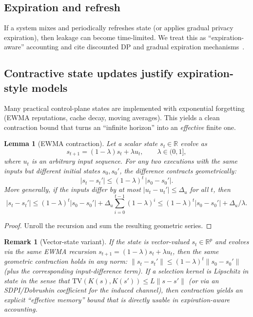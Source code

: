 \documentclass[11pt]{article}
\newtheorem{lemma}{Lemma}
\newtheorem{remark}{Remark}
\newcommand{\TV}{\mathrm{TV}}
\begin{document}
\subsection{Expiration and refresh}
\label{sec:expiration}
If a system mixes and periodically refreshes state (or applies gradual privacy expiration), then leakage can become time-limited.
We treat this as ``expiration-aware'' accounting and cite discounted DP and gradual expiration mechanisms~\cite{Farokhi2020DiscountedDP,AnderssonEtAl2024GradualExpiration}.

\subsection{Contractive state updates justify expiration-style models}
\label{sec:contraction}
Many practical control-plane states are implemented with exponential forgetting (EWMA reputations, cache decay, moving averages).
This yields a clean contraction bound that turns an ``infinite horizon'' into an \emph{effective} finite one.

\begin{lemma}[EWMA contraction]
\label{lem:ewma-contraction}
Let a scalar state $s_t\in\mathbb{R}$ evolve as
\[
s_{t+1}=(1-\lambda)s_t+\lambda u_t,\qquad \lambda\in(0,1],
\]
where $u_t$ is an arbitrary input sequence.
For any two executions with the same inputs but different initial states $s_0,s_0'$, the difference contracts geometrically:
\[
|s_t-s_t'|\le (1-\lambda)^t\,|s_0-s_0'|.
\]
More generally, if the inputs differ by at most $|u_t-u_t'|\le \Delta_u$ for all $t$, then
\[
|s_t-s_t'|\le (1-\lambda)^t|s_0-s_0'|+\Delta_u\sum_{i=0}^{t-1}(1-\lambda)^i\le (1-\lambda)^t|s_0-s_0'|+\Delta_u/\lambda.
\]
\end{lemma}

\begin{proof}
Unroll the recursion and sum the resulting geometric series.
\end{proof}

\begin{remark}[Vector-state variant]
If the state is vector-valued $s_t\in\mathbb{R}^p$ and evolves via the same EWMA recursion $s_{t+1}=(1-\lambda)s_t+\lambda u_t$, then the same geometric contraction holds in any norm:
$\|s_t-s_t'\|\le (1-\lambda)^t\|s_0-s_0'\|$ (plus the corresponding input-difference term).
If a selection kernel is Lipschitz in state in the sense that $\TV(K(s),K(s'))\le L\|s-s'\|$ (or via an SDPI/Dobrushin coefficient for the induced channel), then contraction yields an explicit ``effective memory'' bound that is directly usable in expiration-aware accounting.
\end{remark}
\end{document}
